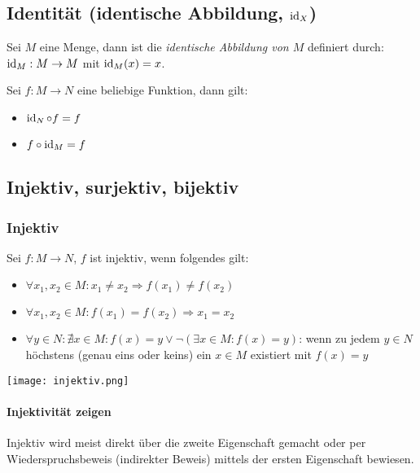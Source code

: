 \subsection{Identität (identische Abbildung, $\operatorname{id}_X$)}\index{$\id$}
Sei $M$ eine Menge, dann ist die \textit{identische Abbildung von $M$} definiert durch:
$\operatorname{id}_M: M \rightarrow M$ mit $\operatorname{id}_M(x) = x$.

Sei $f: M \rightarrow N$ eine beliebige Funktion, dann gilt:
\begin{itemize}
	\item $\operatorname{id}_N \circ f = f$
	\item $f \circ \operatorname{id}_M = f$
\end{itemize}

\subsection{Injektiv, surjektiv, bijektiv}
\subsubsection{Injektiv}
Sei $f: M \rightarrow N$, $f$ ist injektiv, wenn folgendes gilt:
\begin{itemize}
	\item $\forall x_1, x_2 \in M: x_1 \neq x_2 \Rightarrow f(x_1) \neq f(x_2)$
	\item $\forall x_1, x_2 \in M: f(x_1) = f(x_2) \Rightarrow x_1 = x_2$
	\item $\forall y \in N: \nexists x \in M: f(x) = y \lor \lnot(\exists x \in M: f(x) = y)$: wenn zu jedem $y \in N$ höchstens (genau eins oder keins) ein $x \in M$ existiert mit $f(x) = y$
\end{itemize}

\texttt{[image: injektiv.png]}

\paragraph{Injektivität zeigen}
Injektiv wird meist direkt über die zweite Eigenschaft gemacht oder per Wiederspruchsbeweis (indirekter Beweis) mittels der ersten Eigenschaft bewiesen.

